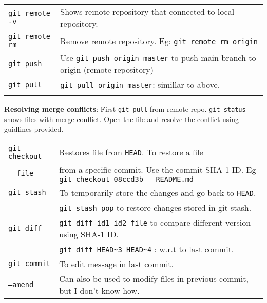 \begin{tabularx}{\linewidth}{lX}
\texttt{git remote -v} & Shows remote repository that connected to local repository. \\
\texttt{git remote rm} & Remove remote repository. Eg: \texttt{git remote rm origin}\\
\texttt{git push} & Use \texttt{git push origin master} to push main branch to origin (remote repository)\\
\texttt{git pull} & \texttt{git pull origin master}: simillar to above.\\
\hline\\
\end{tabularx}

\textbf{Resolving merge conflicts}: First \texttt{git pull} from remote repo. \texttt{git status} shows files with merge conflict. Open the file and resolve the conflict using guidlines provided. \\

\begin{tabularx}{\linewidth}{lX}
\texttt{git checkout} & Restores file from \texttt{HEAD}. To restore a file\\
\texttt{-- file} & from a specific commit. Use the commit SHA-1 ID. Eg \texttt{git checkout 08ccd3b -- README.md}\\
\texttt{git stash} & To temporarily store the changes and go back to \texttt{HEAD}.\\
 & \texttt{git stash pop} to restore changes stored in git stash.\\
\texttt{git diff} & \texttt{git diff id1 id2 file} to compare different version using SHA-1 ID.\\
 & \texttt{git diff HEAD\~{}3 HEAD\~{}4} : w.r.t to last commit.\\
\texttt{git commit} & To edit message in last commit.\\
\texttt{--amend} & Can also be used to modify files in previous commit, but I don't know how.\\
\hline
\end{tabularx}

